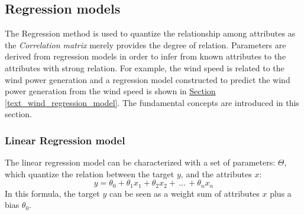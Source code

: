 \documentclass[12pt,a4paper]{report}
\begin{document}
        
        \subsection{Regression models}
        The Regression method is used to quantize the relationship among attributes as the \emph{Correlation matrix} merely provides the degree of relation. Parameters are derived from regression models in order to infer from known attributes to the attributes with strong relation. For example, the wind speed is related to the wind power generation and a regression model constructed to predict the wind power generation from the wind speed is shown in \hyperref[text_wind_regression_model]{Section \ref*{text_wind_regression_model}}.
        The fundamental concepts are introduced in this section.

        \subsubsection{Linear Regression model}
        The linear regression model can be characterized with a set of parameters: $\Theta$, which quantize the relation between the target $y$, and the attributes $x$:
        \begin{equation}
            y = \theta_0 + \theta_1 x_1 + \theta_2 x_2 + \,...\,+\theta_nx_n
        \end{equation}
        In this formula, the target $y$ can be seen as a weight sum of attributes $x$ plus a bias $\theta_0$. 
        

\end{document}

